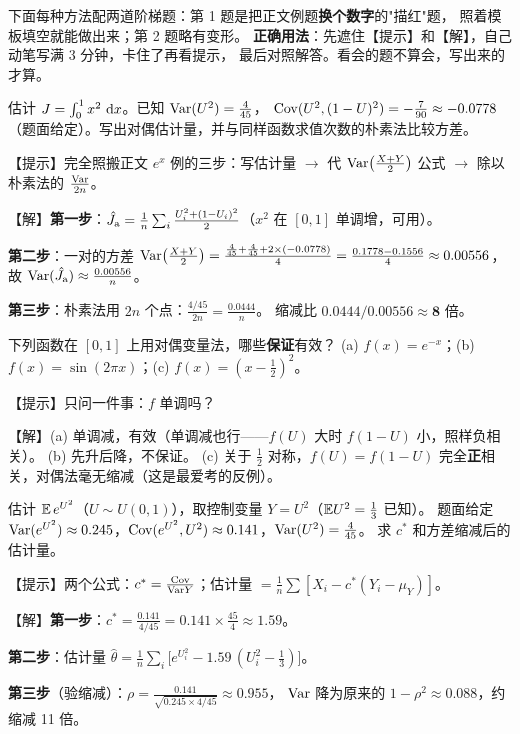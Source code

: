 下面每种方法配两道阶梯题：第 1 题是把正文例题\textbf{换个数字}的"描红"题，
照着模板填空就能做出来；第 2 题略有变形。
\textbf{正确用法}：先遮住【提示】和【解】，自己动笔写满 3 分钟，卡住了再看提示，
最后对照解答。看会的题不算会，写出来的才算。

\begin{exbox}[练习 1A（对偶·描红）]
估计 $J=\int_0^1 x^2\,\,\mathrm{d} x$。已知 $\mathrm{Var}(U^2)=\frac{4}{45}$，
$\mathrm{Cov}(U^2,(1-U)^2)=-\frac{7}{90}\approx-0.0778$（题面给定）。写出对偶估计量，并与同样函数求值次数的朴素法比较方差。
\end{exbox}
\begin{sol}
【提示】完全照搬正文 $e^x$ 例的三步：写估计量 $\to$ 代 $\mathrm{Var}\big(\frac{X+Y}2\big)$
公式 $\to$ 除以朴素法的 $\frac{\mathrm{Var}}{2n}$。

【解】\textbf{第一步}：$\hat J_{\text a}=\frac1n\sum_i\frac{U_i^2+(1-U_i)^2}{2}$（$x^2$ 在 $[0,1]$ 单调增，可用）。

\textbf{第二步}：一对的方差
$\mathrm{Var}\big(\frac{X+Y}2\big)=\frac{\frac4{45}+\frac4{45}+2\times(-0.0778)}{4}
=\frac{0.1778-0.1556}{4}\approx0.00556$，
故 $\mathrm{Var}(\hat J_{\text a})\approx\frac{0.00556}{n}$。

\textbf{第三步}：朴素法用 $2n$ 个点：$\frac{4/45}{2n}=\frac{0.0444}{n}$。
缩减比 $0.0444/0.00556\approx \textbf{8 倍}$。
\end{sol}

\begin{exbox}[练习 1B（对偶·判断）]
下列函数在 $[0,1]$ 上用对偶变量法，哪些\textbf{保证}有效？
(a) $f(x)=e^{-x}$；(b) $f(x)=\sin(2\pi x)$；(c) $f(x)=(x-\tfrac12)^2$。
\end{exbox}
\begin{sol}
【提示】只问一件事：$f$ 单调吗？

【解】(a) 单调减，有效（单调减也行——$f(U)$ 大时 $f(1-U)$ 小，照样负相关）。
(b) 先升后降，不保证。
(c) 关于 $\frac12$ 对称，$f(U)=f(1-U)$ 完全\textbf{正}相关，对偶法毫无缩减（这是最爱考的反例）。
\end{sol}

\begin{exbox}[练习 2A（控制变量·描红）]
估计 $\mathbb{E}\,e^{U^2}$（$U\sim U(0,1)$），取控制变量 $Y=U^2$（$\mathbb{E} U^2=\frac13$ 已知）。
题面给定 $\mathrm{Var}(e^{U^2})\approx0.245$，$\mathrm{Cov}(e^{U^2},U^2)\approx0.141$，$\mathrm{Var}(U^2)=\frac4{45}$。
求 $c^*$ 和方差缩减后的估计量。
\end{exbox}
\begin{sol}
【提示】两个公式：$c^*=\frac{\mathrm{Cov}}{\mathrm{Var} Y}$；估计量 $=\frac1n\sum[X_i-c^*(Y_i-\mu_Y)]$。

【解】\textbf{第一步}：$c^*=\frac{0.141}{4/45}=0.141\times\frac{45}{4}\approx1.59$。

\textbf{第二步}：估计量 $\hat\theta=\frac1n\sum_i\big[e^{U_i^2}-1.59\,(U_i^2-\tfrac13)\big]$。

\textbf{第三步}（验缩减）：$\rho=\frac{0.141}{\sqrt{0.245\times4/45}}\approx0.955$，
$\mathrm{Var}$ 降为原来的 $1-\rho^2\approx0.088$，约缩减 11 倍。
\end{sol}

